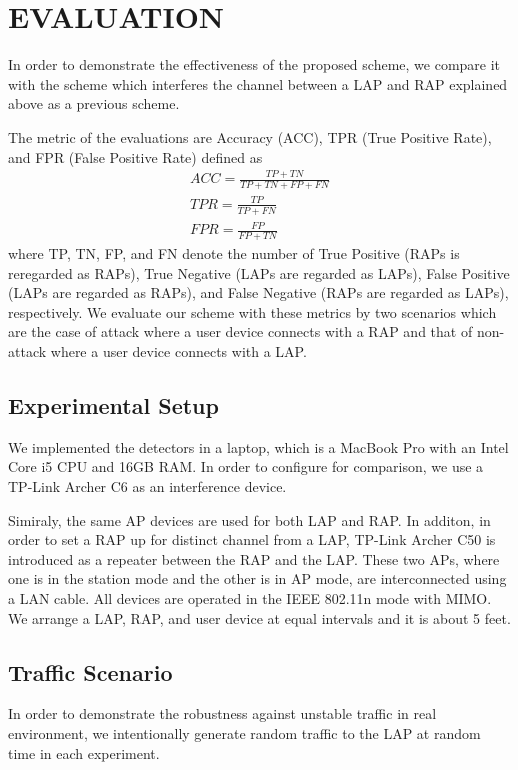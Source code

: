 \documentclass[conference]{IEEEtran}
\begin{document}
\section{EVALUATION}\label{sec:5}
In order to demonstrate the effectiveness of the proposed scheme, we compare it with the scheme \cite{previous} which interferes the channel between a LAP and RAP explained above as a previous scheme.

The metric of the evaluations are Accuracy (ACC), TPR (True Positive Rate), and FPR (False Positive Rate) defined as
\begin{gather}
    ACC = \frac{TP + TN}{TP + TN + FP + FN} \\
    TPR = \frac{TP}{TP + FN} \\
    FPR = \frac{FP}{FP + TN}
\end{gather}
where TP, TN, FP, and FN denote the number of True Positive (RAPs is reregarded as RAPs), True Negative (LAPs are regarded as LAPs), False Positive (LAPs are regarded as RAPs), and False Negative (RAPs are regarded as LAPs), respectively.
We evaluate our scheme with these metrics by two scenarios which are the case of attack where a user device connects with a RAP and that of non-attack where a user device connects with a LAP.

\subsection{Experimental Setup}
We implemented the detectors in a laptop, which is a MacBook Pro with an Intel Core i5 CPU and 16GB RAM.
In order to configure \cite{previous} for comparison, we use a TP-Link Archer C6 as an interference device.

Simiraly, the same AP devices are used for both LAP and RAP.
In additon, in order to set a RAP up for distinct channel from a LAP, TP-Link Archer C50 is introduced as a repeater between the RAP and the LAP.
These two APs, where one is in the station mode and the other is in AP mode, are interconnected using a LAN cable.
All devices are operated in the IEEE 802.11n mode with MIMO.
We arrange a LAP, RAP, and user device at equal intervals and it is about 5 feet.

\subsection{Traffic Scenario}
In order to demonstrate the robustness against unstable traffic in real environment, we intentionally generate random traffic to the LAP at random time in each experiment.
\end{document}
